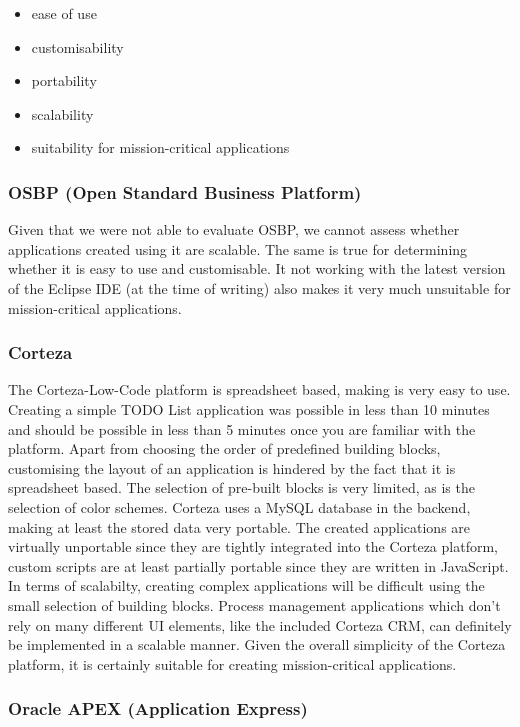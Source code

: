 \documentclass[runningheads]{llncs}
\begin{document}
\begin{itemize}
  \item ease of use
  \item customisability
  \item portability
  \item scalability
  \item suitability for mission-critical applications
\end{itemize}

\subsubsection{OSBP (Open Standard Business Platform)}

Given that we were not able to evaluate OSBP, we cannot assess whether applications created using it are scalable. The same is true for determining whether it is easy to use and customisable. It not working with the latest version of the Eclipse IDE (at the time of writing) also makes it very much unsuitable for mission-critical applications.

\subsubsection{Corteza}

The Corteza-Low-Code platform is spreadsheet based, making is very easy to use. Creating a simple TODO List application was possible in less than 10 minutes and should be possible in less than 5 minutes once you are familiar with the platform. Apart from choosing the order of predefined building blocks, customising the layout of an application is hindered by the fact that it is spreadsheet based. The selection of pre-built blocks is very limited, as is the selection of color schemes. Corteza uses a MySQL database in the backend, making at least the stored data very portable. The created applications are virtually unportable since they are tightly integrated into the Corteza platform, custom scripts are at least partially portable since they are written in JavaScript. In terms of scalabilty, creating complex applications will be difficult using the small selection of building blocks. Process management applications which don't rely on many different UI elements, like the included Corteza CRM, can definitely be implemented in a scalable manner. Given the overall simplicity of the Corteza platform, it is certainly suitable for creating mission-critical applications.

\subsubsection{Oracle APEX (Application Express)}
\end{document}
